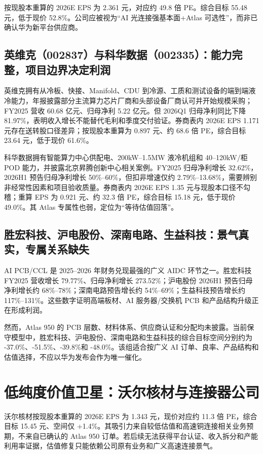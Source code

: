 按现股本重算的 2026E EPS 为 2.361 元，对应约 49.8 倍 PE。综合目标 55.48 元，低于现价 52.8\%。公司应被视为“AI 光连接强基本面+Atlas 可选性”，而非已确认华为新平台供应商。

\subsection{英维克（002837）与科华数据（002335）：能力完整，项目边界决定利润}

英维克拥有从冷板、快接、Manifold、CDU 到冷源、工质和测试设备的端到端液冷能力，年报披露部分主流算力芯片厂商和头部设备厂商认可并开始规模采购；FY2025 营收 60.68 亿元、归母净利 5.22 亿元。但 2026Q1 归母净利同比下降 81.97\%，表明收入增长不能替代毛利和季度交付验证。券商表内 2026E EPS 1.171 元存在送转股口径差异；按现股本重算为 0.897 元、约 68.6 倍 PE，综合目标 23.64 元，低于现价 61.6\%。

科华数据拥有智能算力中心供配电、200kW--1.5MW 液冷机组和 40--120kW/柜 POD 能力，并披露北京昇腾创新中心相关案例。FY2025 归母净利增长 32.62\%，2026H1 预告归母净利增长 50\%--60\%，但扣非增速仅约 2.79\%--13.68\%，需要辨别非经常性因素和项目验收质量。券商表内 2026E EPS 1.35 元与现股本口径不勾稽；重算 EPS 为 0.921 元、约 32.3 倍 PE，综合目标 15.18 元，低于现价 49.0\%。其 Atlas 专属性也弱，定位为“等待估值回落”。

\subsection{胜宏科技、沪电股份、深南电路、生益科技：景气真实，专属关系缺失}

AI PCB/CCL 是 2025--2026 年财务兑现最强的广义 AIDC 环节之一。胜宏科技 FY2025 营收增长 79.77\%、归母净利增长 273.52\%；沪电股份 2026H1 预告归母净利增长约 68\%--78\%；深南电路预告增长约 54\%--69\%；生益科技预告增长约 117\%--131\%。这些数字证明高端板材、AI 服务器/交换机 PCB 和产品结构升级正在形成利润。

然而，Atlas 950 的 PCB 层数、材料体系、供应商认证和分配均未披露。当前保守模型中，胜宏科技、沪电股份、深南电路和生益科技的综合目标空间分别约为 -37.0\%、-51.5\%、-39.8\%和 -48.0\%。该组适合按广义 AI 订单、良率、产品结构和估值选择，不应以华为发布会作为唯一催化。

\section{低纯度价值卫星：沃尔核材与连接器公司}

沃尔核材按现股本重算的 2026E EPS 为 1.343 元，现价对应约 11.3 倍 PE，综合目标 15.45 元、空间仅 +1.4\%。其吸引力来自较低估值和高速铜连接相关业务预期，不来自已确认的 Atlas 950 订单。若后续无法获得平台认证、收入拆分和产能利用率证据，估值修复只能依赖公司原有业务和广义高速连接景气。

